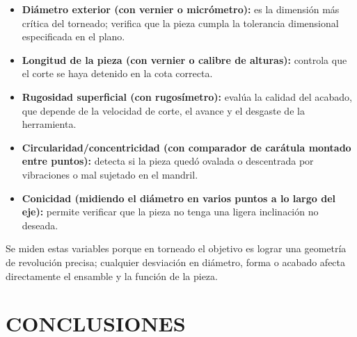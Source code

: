 \documentclass[12pt,a4paper]{article}
\begin{document}
\begin{itemize}
	\item \textbf{Diámetro exterior (con vernier o micrómetro):} es la dimensión
	      más crítica del torneado; verifica que la pieza cumpla la tolerancia
	      dimensional especificada en el plano.\\[-10pt]
	\item \textbf{Longitud de la pieza (con vernier o calibre de alturas):}
	      controla que el corte se haya detenido en la cota correcta.\\[-10pt]
	\item \textbf{Rugosidad superficial (con rugosímetro):} evalúa la calidad del
	      acabado, que depende de la velocidad de corte, el avance y el desgaste
	      de la herramienta.\\[-10pt]
	\item \textbf{Circularidad/concentricidad (con comparador de carátula montado
		      entre puntos):} detecta si la pieza quedó ovalada o descentrada por
	      vibraciones o mal sujetado en el mandril.\\[-10pt]
	\item \textbf{Conicidad (midiendo el diámetro en varios puntos a lo largo del
		      eje):} permite verificar que la pieza no tenga una ligera inclinación
	      no deseada.
\end{itemize}

Se miden estas variables porque en torneado el objetivo es lograr una geometría
de revolución precisa; cualquier desviación en diámetro, forma o acabado afecta
directamente el ensamble y la función de la pieza.

\section{CONCLUSIONES}
\end{document}
